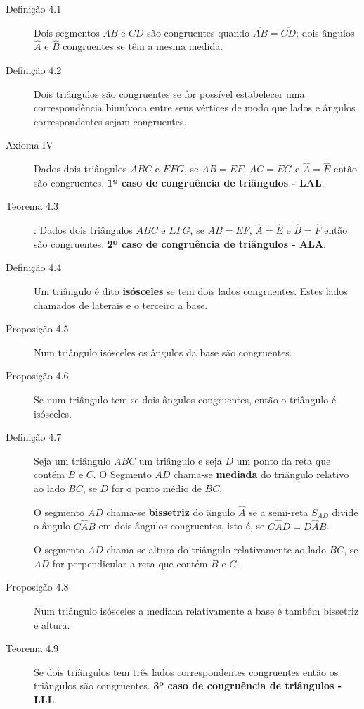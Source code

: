\documentclass[11pt]{article}
\begin{document}
\begin{description}
  \item[Definição 4.1] Dois segmentos $AB$ e $CD$ são congruentes quando
    $\overline{AB} = \overline{CD}$; dois ângulos $\hat{A}$ e $\hat{B}$
    congruentes se têm a mesma medida.

  \item[Definição 4.2] Dois triângulos são congruentes se for possível
    estabelecer uma correspondência biunívoca entre seus vértices de modo que
    lados e ângulos correspondentes sejam congruentes.

  \item[Axioma IV] Dados dois triângulos $ABC$ e $EFG$, se $AB = EF$, $AC = EG$
    e $\hat{A} = \hat{E}$ então são congruentes.
    \textbf{1º caso de congruência de triângulos - LAL}.

  \item[Teorema 4.3]: Dados dois triângulos $ABC$ e $EFG$, se $AB = EF$,
    $\hat{A} = \hat{E}$ e $\hat{B} = \hat{F}$ então são congruentes.
    \textbf{2º caso de congruência de triângulos - ALA}.

  \item[Definição 4.4] Um triângulo é dito \textbf{isósceles} se tem dois lados
    congruentes. Estes lados chamados de laterais e o terceiro a base.

  \item[Proposição 4.5] Num triângulo isósceles os ângulos da base são
    congruentes.

  \item[Proposição 4.6] Se num triângulo tem-se dois ângulos congruentes,
    então o triângulo é isósceles.

  \item[Definição 4.7] Seja um triângulo $ABC$ um triângulo e seja $D$ um ponto
    da reta que contém $B$ e $C$. O Segmento $AD$ chama-se \textbf{mediada}
    do triângulo relativo ao lado $BC$, se $D$ for o ponto médio de $BC$.

    O segmento $AD$ chama-se \textbf{bissetriz} do ângulo $\hat{A}$ se a
    semi-reta $S_{AD}$ divide o ângulo $C\hat{A}B$ em dois ângulos
    congruentes, isto é, se $C\hat{A}D = D\hat{A}B$.

    O segmento $AD$ chama-se altura do triângulo relativamente ao lado $BC$, se
    $AD$ for perpendicular a reta que contém $B$ e $C$.

  \item[Proposição 4.8] Num triângulo isósceles a mediana relativamente a base
    é também bissetriz e altura.

  \item[Teorema 4.9] Se dois triângulos tem três lados correspondentes
    congruentes então os triângulos são congruentes.
    \textbf{3º caso de congruência de triângulos - LLL}.
\end{description}
\end{document}
